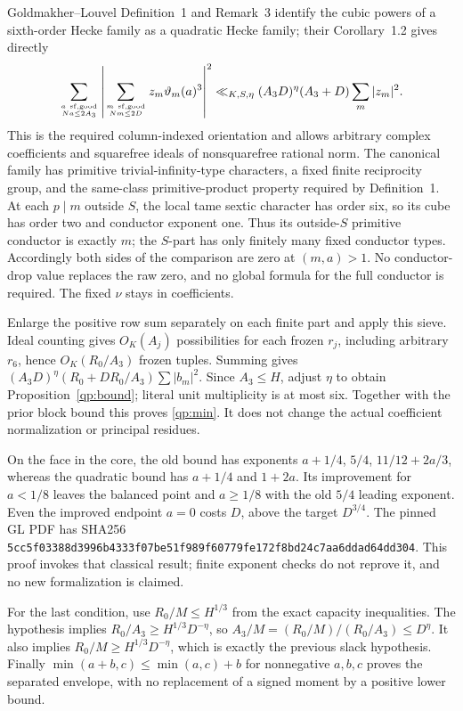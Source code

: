 \documentclass[11pt]{article}
\theoremstyle{definition}\newtheorem{definition}[theorem]{Definition}
\theoremstyle{remark}\newtheorem{remark}[theorem]{Remark}
\begin{document}
Goldmakher--Louvel Definition~1 and Remark~3 identify the cubic powers
of a sixth-order Hecke family as a quadratic Hecke family; their
Corollary~1.2 gives directly
\[
 \sum_{a\ \mathrm{sf,good}\atop Na\le2A_3}
 \left|\sum_{m\ \mathrm{sf,good}\atop Nm\le2D}
                z_m\vartheta_m(a)^3\right|^2
 \ll_{K,S,\eta}(A_3D)^\eta(A_3+D)\sum_m|z_m|^2.
\]
This is the required column-indexed orientation and allows arbitrary
complex coefficients and squarefree ideals of nonsquarefree rational norm.
The canonical family has primitive trivial-infinity-type characters, a
fixed finite reciprocity group, and the same-class primitive-product
property required by Definition~1. At each $p\mid m$ outside $S$, the
local tame sextic character has order six, so its cube has order two and
conductor exponent one. Thus its outside-$S$ primitive conductor is
exactly $m$; the $S$-part has only finitely many fixed conductor types.
Accordingly both sides of the comparison are zero at $(m,a)>1$.
No conductor-drop value replaces the raw zero, and no global formula
for the full conductor is required. The fixed $\nu$ stays in coefficients.

Enlarge the positive row sum separately on each finite part and apply
this sieve. Ideal counting gives $O_K(A_j)$ possibilities for each frozen
$r_j$, including arbitrary $r_6$, hence $O_K(R_0/A_3)$ frozen tuples.
Summing gives $(A_3D)^\eta(R_0+DR_0/A_3)\sum|b_m|^2$.
Since $A_3\le H$, adjust $\eta$ to obtain
Proposition~\ref{qp:bound}; literal unit multiplicity is at most six.
Together with the prior block bound this proves
\eqref{qp:min}. It does not change the actual coefficient
normalization or principal residues.

On the face in the core, the old bound has exponents
$a+1/4$, $5/4$, $11/12+2a/3$, whereas the quadratic bound has
$a+1/4$ and $1+2a$. Its improvement for $a<1/8$ leaves the balanced
point and $a\ge1/8$ with the old $5/4$ leading exponent. Even the
improved endpoint $a=0$ costs $D$, above the target $D^{3/4}$.
The pinned GL PDF has SHA256
\texttt{5cc5f03388d3996b4333f07be51f989f}\allowbreak\texttt{60779fe172f8bd24c7aa6ddad64dd304}.
This proof invokes that classical result; finite exponent checks do not
reprove it, and no new formalization is claimed.

For the last condition, use $R_0/M\le H^{1/3}$ from the exact
capacity inequalities. The hypothesis implies
$R_0/A_3\ge H^{1/3}D^{-\eta}$, so
$A_3/M=(R_0/M)/(R_0/A_3)\le D^\eta$.
It also implies $R_0/M\ge H^{1/3}D^{-\eta}$, which is exactly
the previous slack hypothesis. Finally
$\min(a+b,c)\le\min(a,c)+b$ for nonnegative $a,b,c$
proves the separated envelope, with no replacement of a signed moment
by a positive lower bound.
\end{document}
